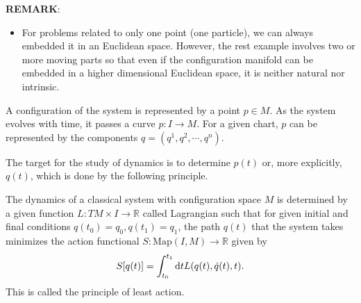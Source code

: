 \textbf{REMARK}:
\begin{itemize}
    \item For problems related to only one point (one particle), we can always embedded it in an Euclidean space. However, the rest example involves two or more moving parts so that even if the configuration manifold can be embedded in a higher dimensional Euclidean space, it is neither natural nor intrinsic.
\end{itemize}

A configuration of the system is represented by a point $p\in M$. As the system evolves with time, it passes a curve $p: I\rightarrow M$. For a given chart, $p$ can be represented by the components $q=(q^1,q^2,\cdots,q^n)$.

The target for the study of dynamics is to determine $p(t)$ or, more explicitly, $q(t)$, which is done by the following principle.

\begin{principle}
The dynamics of a classical system with configuration space $M$ is determined by a given function $L: TM\times I\rightarrow \mathbb{R}$ called Lagrangian such that for given initial and final conditions $q(t_0)=q_0, q(t_1)=q_1$, the path $q(t)$ that the system takes minimizes the action functional $S:\mathrm{Map}(I, M)\rightarrow \mathbb{R}$ given by
\begin{equation}
    S[q(t)]=\int_{t_0}^{t_1}\mathrm{d} t L(q(t), \dot{q}(t), t).
\end{equation}
This is called the principle of least action. 
\end{principle}

